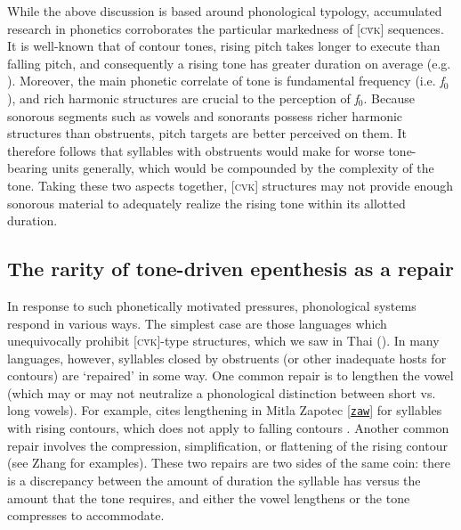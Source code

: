 \documentclass[output=paper,colorlinks,citecolor=brown,draft,draftmode]{langscibook}
\begin{document}
While the above discussion is based around phonological typology, accumulated research in phonetics corroborates the particular markedness of [\textsc{c\v{v}k}] sequences.
It is well-known that of contour tones, rising pitch takes longer to execute than falling pitch, and consequently a rising tone has greater duration on average (e.g. \citealt{sundberg1973,zhang2013}).
Moreover, the main phonetic correlate of tone is  fundamental frequency (i.e. \textit{f}$_0$), and rich harmonic structures are crucial to the perception of \textit{f}$_0$.
Because sonorous segments such as vowels and sonorants possess richer harmonic structures than obstruents, pitch targets are better perceived on them.
It therefore follows that syllables with obstruents would make for worse tone-bearing units generally, which would be compounded by the complexity of the tone.
Taking these two aspects together, [\textsc{cvk}] structures may not provide enough sonorous material to adequately realize the rising tone within its allotted duration.
 

\subsection{The rarity of tone-driven epenthesis as a repair}\label{sec:repairs}

In response to  such phonetically motivated pressures, phonological systems respond in various ways.
The simplest case are  those languages which unequivocally prohibit [\textsc{c\v{v}k}]-type structures, which we saw in Thai ().
In many languages, however, syllables closed by obstruents (or other inadequate hosts for contours)  are `repaired' in some way.
One common repair is to lengthen the vowel (which may or may not neutralize a phonological distinction between short vs. long vowels).
For example, \citet{zhang2013} cites lengthening in Mitla Zapotec [\href{https://glottolog.org/resource/languoid/id/mitl1236}{\texttt{zaw}}] 
for syllables with rising contours, which does not apply to  falling contours \citep{briggs1961}.
Another common repair involves the compression, simplification, or flattening of the rising contour (see Zhang for examples).
These two repairs are two sides of the same coin: 
there is a discrepancy between the amount of duration the syllable has versus the amount that the tone requires, and either the vowel lengthens or the tone compresses to accommodate. 
\end{document}
